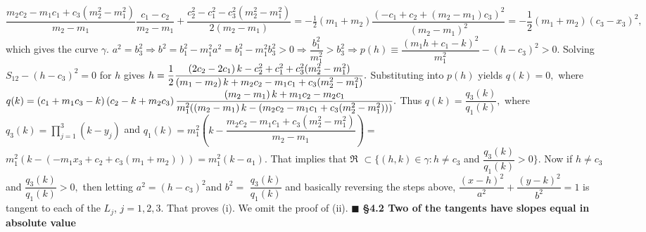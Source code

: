 $\dfrac{m_{2}c_{2}-m_{1}c_{1}+c_{3}(m_{2}^{2}-m_{1}^{2})}{m_{2}-m_{1}}\dfrac{c_{1}-c_{2}}{m_{2}-m_{1}}+\dfrac{c_{2}^{2}-c_{1}^{2}-c_{3}^{2}(m_{2}^{2}-m_{1}^{2})}{2(m_{2}-m_{1})}=\allowbreak -\frac{1}{2}\left( m_{1}+m_{2}\right) \dfrac{\left( -c_{1}+c_{2}+(m_{2}-m_{1})c_{3}\right) ^{2}}{\left( m_{2}-m_{1}\right) ^{2}}=-\dfrac{1}{2}\left( m_{1}+m_{2}\right) (c_{3}-x_{3})^{2},$ which gives the curve $\gamma .$ $a^{2}=b_{3}^{2}\Rightarrow b^{2}=b_{1}^{2}-m_{1}^{2}a^{2}=b_{1}^{2}-m_{1}^{2}b_{3}^{2}>0\Rightarrow \dfrac{b_{1}^{2}}{m_{1}^{2}}>b_{3}^{2}\Rightarrow p(h)\equiv \dfrac{(\allowbreak m_{1}h+c_{1}-k)^{2}}{m_{1}^{2}}-(h-c_{3})^{2}>0.$ Solving $S_{12}-(h-c_{3})^{2}=\allowbreak 0$ for $h$ gives $h=\dfrac{1}{2}\dfrac{\allowbreak \left( 2c_{2}-2c_{1}\right) k-c_{2}^{2}+c_{1}^{2}+c_{3}^{2}(m_{2}^{2}-m_{1}^{2})}{\left( m_{1}-m_{2}\right) k+m_{2}c_{2}-m_{1}c_{1}+c_{3}(m_{2}^{2}-m_{1}^{2})}.$ Substituting into $p(h)$ yields $q(k)=0,$ where $q(k)=\left( c_{1}+m_{1}c_{3}-k\right) \left( c_{2}-k+m_{2}c_{3}\right) \dfrac{\allowbreak \left( m_{2}-m_{1}\right) k+m_{1}c_{2}-m_{2}c_{1}}{m_{1}^{2}(\left( m_{2}-m_{1}\right) k-(m_{2}c_{2}-m_{1}c_{1}+c_{3}(m_{2}^{2}-m_{1}^{2})))}.$ Thus $q(k)=\dfrac{q_{3}(k)}{q_{1}(k)},$ where $q_{3}(k)=\prod\limits_{j=1}^{3}(k-y_{j})$ and $q_{1}(k)=m_{1}^{2}(k-\dfrac{m_{2}c_{2}-m_{1}c_{1}+c_{3}(m_{2}^{2}-m_{1}^{2})}{m_{2}-m_{1}})=$ $m_{1}^{2}(k-(-m_{1}x_{3}+c_{2}+c_{3}(m_{1}+m_{2})))=m_{1}^{2}(k-a_{1}).$ That implies that $\Re $ $\subset \{(h,k)\in \gamma :h\neq c_{3}$ and $\dfrac{q_{3}(k)}{q_{1}(k)}>0\}.$ Now if $h\neq c_{3}$ and $\dfrac{q_{3}(k)}{q_{1}(k)}>0,$ then letting $a^{2}=(h-c_{3})^{2}$and $b^{2}=$ $\dfrac{q_{3}(k)}{q_{1}(k)}$ and basically reversing the steps above, $\dfrac{(x-h)^{2}}{a^{2}}+\dfrac{(y-k)^{2}}{b^{2}}=1$ is tangent to each of the $L_{j}$, $j=1,2,3.$ That proves (i). We omit the proof of (ii).  
$\blacksquare$ \nl \nl
\bf \S 4.2 Two of the tangents have slopes equal in absolute value \rm \nl
